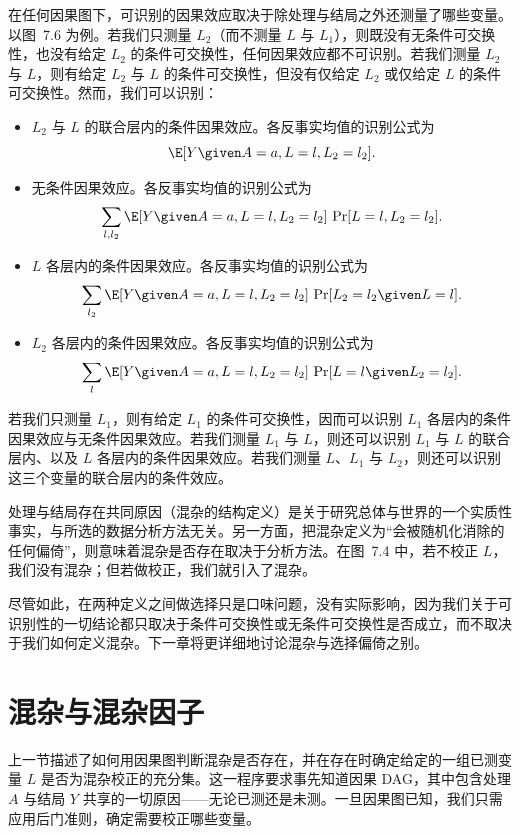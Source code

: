 \begin{finepoint}[条件效应与无条件效应的识别]
在任何因果图下，可识别的因果效应取决于除处理与结局之外还测量了哪些变量。以图~7.6 为例。若我们只测量 $L_2$（而不测量 $L$ 与 $L_1$），则既没有无条件可交换性，也没有给定 $L_2$ 的条件可交换性，任何因果效应都不可识别。若我们测量 $L_2$ 与 $L$，则有给定 $L_2$ 与 $L$ 的条件可交换性，但没有仅给定 $L_2$ 或仅给定 $L$ 的条件可交换性。然而，我们可以识别：

\begin{itemize}
\item $L_2$ 与 $L$ 的联合层内的条件因果效应。各反事实均值的识别公式为
\[
\E[Y\given A=a,L=l,L_2=l_2].
\]
\item 无条件因果效应。各反事实均值的识别公式为
\[
\sum_{l,l_2}\E[Y\given A=a,L=l,L_2=l_2]\,\Pr[L=l,L_2=l_2].
\]
\item $L$ 各层内的条件因果效应。各反事实均值的识别公式为
\[
\sum_{l_2}\E[Y\given A=a,L=l,L_2=l_2]\,\Pr[L_2=l_2\given L=l].
\]
\item $L_2$ 各层内的条件因果效应。各反事实均值的识别公式为
\[
\sum_{l}\E[Y\given A=a,L=l,L_2=l_2]\,\Pr[L=l\given L_2=l_2].
\]
\end{itemize}

若我们只测量 $L_1$，则有给定 $L_1$ 的条件可交换性，因而可以识别 $L_1$ 各层内的条件因果效应与无条件因果效应。若我们测量 $L_1$ 与 $L$，则还可以识别 $L_1$ 与 $L$ 的联合层内、以及 $L$ 各层内的条件因果效应。若我们测量 $L$、$L_1$ 与 $L_2$，则还可以识别这三个变量的联合层内的条件效应。
\end{finepoint}

处理与结局存在共同原因（混杂的结构定义）是关于研究总体与世界的一个实质性事实，与所选的数据分析方法无关。另一方面，把混杂定义为“会被随机化消除的任何偏倚”，则意味着混杂是否存在取决于分析方法。在图~7.4 中，若不校正 $L$，我们没有混杂；但若做校正，我们就引入了混杂。

尽管如此，在两种定义之间做选择只是口味问题，没有实际影响，因为我们关于可识别性的一切结论都只取决于条件可交换性或无条件可交换性是否成立，而不取决于我们如何定义混杂。下一章将更详细地讨论混杂与选择偏倚之别。

\section{混杂与混杂因子}

上一节描述了如何用因果图判断混杂是否存在，并在存在时确定给定的一组已测变量 $L$ 是否为混杂校正的充分集。这一程序要求事先知道因果 DAG，其中包含处理 $A$ 与结局 $Y$ 共享的一切原因——无论已测还是未测。一旦因果图已知，我们只需应用后门准则，确定需要校正哪些变量。

